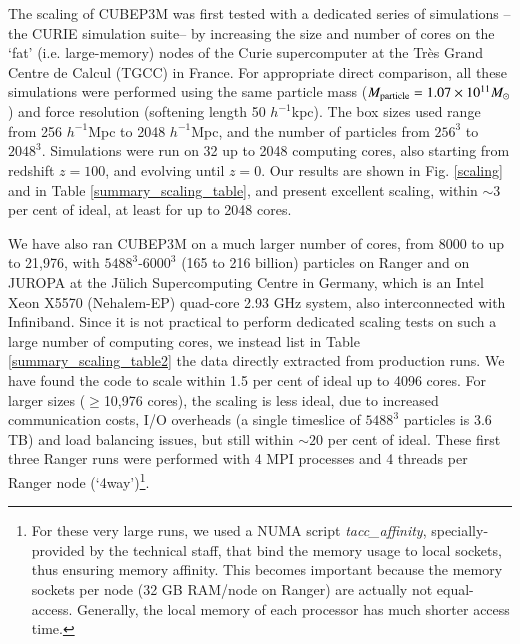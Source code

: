  
The scaling of {\small CUBEP3M}  was first  tested with a dedicated series 
of simulations -- the CURIE simulation suite-- by increasing the size and number of cores on the `fat' 
(i.e. large-memory) nodes of the  Curie supercomputer at the Tr\`{e}s Grand Centre de Calcul (TGCC) in France. 
 For appropriate direct comparison,
all these simulations were performed using the same particle mass 
($M_{\rm particle}=1.07\times10^{11}M_\odot$) and force resolution 
(softening length 50 $h^{-1}$kpc). The box sizes used range from 256 $h^{-1}$Mpc
to 2048 $h^{-1}$Mpc, and the number of particles from $256^3$ to $2048^3$.
Simulations were run on 32 up to 2048 computing cores, also starting from 
redshift $z=100$, and evolving until $z=0$. Our results are shown in Fig. \ref{scaling} and in Table \ref{summary_scaling_table}, and present excellent scaling, within 
$\sim3$ per cent of ideal, at least for up to 2048 cores. 



We have also ran {\small CUBEP3M} on a much larger number of cores, 
from 8000 to up to 21,976, with $5488^3$-$6000^3$ (165 to 216 billion) 
particles on Ranger and on JUROPA at the J\"ulich Supercomputing Centre in Germany, 
which is an Intel Xeon X5570 
(Nehalem-EP) quad-core 2.93 GHz system, also interconnected with Infiniband.
Since it is not practical to perform dedicated scaling tests on such a large number of
computing cores, we instead list in Table \ref{summary_scaling_table2} 
the data directly extracted from production runs. We have found the 
code to scale within 1.5 per cent of ideal up to 4096 cores. 
For larger sizes ($\ge$10,976 cores), the scaling is less ideal,
due to increased communication 
costs, I/O overheads (a single timeslice of $5488^3$ particles is 3.6 TB)
and load balancing issues, but still within $\sim20$ per cent of ideal. 
These first three Ranger runs were performed 
with 4 {\small MPI} processes and 4 threads per Ranger node (`4way')\footnote{For these very large runs, 
we used a NUMA script {\it tacc\_affinity}, specially-provided by the technical staff, 
that bind the memory usage to local sockets, thus ensuring memory affinity. 
This becomes important because the memory sockets per node 
(32 GB RAM/node on Ranger) are actually not equal-access. Generally, the local 
memory of each processor has much shorter access time.}.

